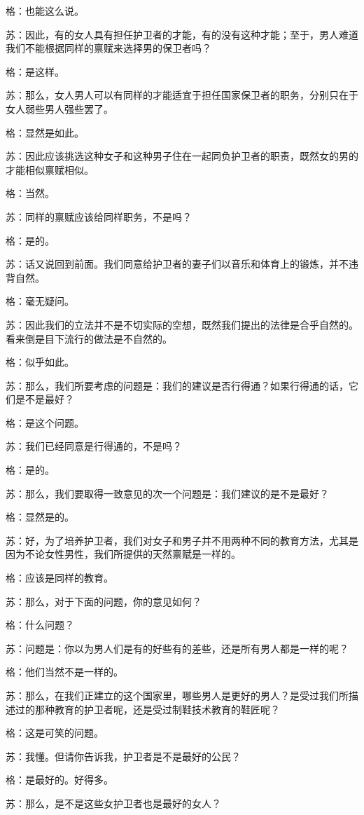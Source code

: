 \documentclass[12pt,oneside]{book}
\begin{document}
格：也能这么说。

苏：因此，有的女人具有担任护卫者的才能，有的没有这种才能；至于，男人难道我们不能根据同样的禀赋来选择男的保卫者吗？

格：是这样。

苏：那么，女人男人可以有同样的才能适宜于担任国家保卫者的职务，分别只在于女人弱些男人强些罢了。

格：显然是如此。

苏：因此应该挑选这种女子和这种男子住在一起同负护卫者的职责，既然女的男的才能相似禀赋相似。

格：当然。

苏：同样的禀赋应该给同样职务，不是吗？

格：是的。

苏：话又说回到前面。我们同意给护卫者的妻子们以音乐和体育上的锻炼，并不违背自然。

格：毫无疑问。

苏：因此我们的立法并不是不切实际的空想，既然我们提出的法律是合乎自然的。看来倒是目下流行的做法是不自然的。

格：似乎如此。

苏：那么，我们所要考虑的问题是：我们的建议是否行得通？如果行得通的话，它们是不是最好？

格：是这个问题。

苏：我们已经同意是行得通的，不是吗？

格：是的。

苏：那么，我们要取得一致意见的次一个问题是：我们建议的是不是最好？

格：显然是的。

苏：好，为了培养护卫者，我们对女子和男子并不用两种不同的教育方法，尤其是因为不论女性男性，我们所提供的天然禀赋是一样的。

格：应该是同样的教育。

苏：那么，对于下面的问题，你的意见如何？

格：什么问题？

苏：问题是：你以为男人们是有的好些有的差些，还是所有男人都是一样的呢？

格：他们当然不是一样的。

苏：那么，在我们正建立的这个国家里，哪些男人是更好的男人？是受过我们所描述过的那种教育的护卫者呢，还是受过制鞋技术教育的鞋匠呢？

格：这是可笑的问题。

苏：我懂。但请你告诉我，护卫者是不是最好的公民？

格：是最好的。好得多。

苏：那么，是不是这些女护卫者也是最好的女人？
\end{document}
